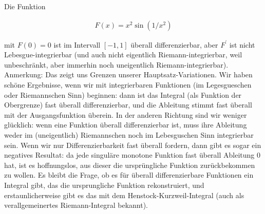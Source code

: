 
\begin{exercise}

Die Funktion

\begin{align*}
    F(x) = x^2 \sin(1 / x^2)
\end{align*}

mit $F(0) = 0$ ist im Intervall $[-1, 1]$ überall differenzierbar, aber $F^\prime$ ist nicht Lebesgue-integrierbar (und auch nicht eigentlich Riemann-integrierbar, weil unbeschränkt, aber immerhin noch uneigentlich Riemann-integrierbar).
Anmerkung:
Das zeigt uns Grenzen unserer Hauptsatz-Variationen.
Wir haben schöne Ergebnisse, wenn wir mit integrierbaren Funktionen (im Legesgueschen oder Riemannschen Sinn) beginnen:
dann ist das Integral (als Funktion der Obergrenze) fast überall differenzierbar, und die Ableitung stimmt fast überall mit der Ausgangsfunktion überein.
In der anderen Richtung sind wir weniger glücklich:
wenn eine Funktion überall differenzierbar ist, muss ihre Ableitung weder im (uneigentlich) Riemannschen noch im Lebesguschen Sinn integrierbar sein.
Wenn wir nur Differenzierbarkeit fast überall fordern, dann gibt es sogar ein negatives Resultat:
da jede singuläre monotone Funktion fast überall Ableitung $0$ hat, ist es hoffnungslos, aus dieser die ursprüngliche Funktion zurückbekommen zu wollen.
Es bleibt die Frage, ob es für überall differenzierbare Funktionen ein Integral gibt, das die ursprungliche Funktion rekonstruiert, und erstaunlicherweise gibt es das mit dem Henstock-Kurzweil-Integral (auch als verallgemeinertes Riemann-Integral bekannt).

\end{exercise}


